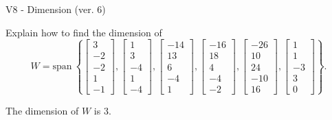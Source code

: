 \begin{exercise}
  \begin{exerciseTitle}V8 - Dimension (ver. 6)\end{exerciseTitle}
  \begin{exerciseStatement}
    Explain how to find the dimension of 
\[W=\mathrm{span}\ \left\{\left[\begin{array}{r}
3 \\
-2 \\
-2 \\
1 \\
-1
\end{array}\right] , \left[\begin{array}{r}
1 \\
3 \\
-4 \\
1 \\
-4
\end{array}\right] , \left[\begin{array}{r}
-14 \\
13 \\
6 \\
-4 \\
1
\end{array}\right] , \left[\begin{array}{r}
-16 \\
18 \\
4 \\
-4 \\
-2
\end{array}\right] , \left[\begin{array}{r}
-26 \\
10 \\
24 \\
-10 \\
16
\end{array}\right] , \left[\begin{array}{r}
1 \\
1 \\
-3 \\
3 \\
0
\end{array}\right]\right\}.\]



  \end{exerciseStatement}
  \begin{exerciseAnswer}
   The dimension of \(W\) is  \(3\).
  


  \end{exerciseAnswer}
\end{exercise}